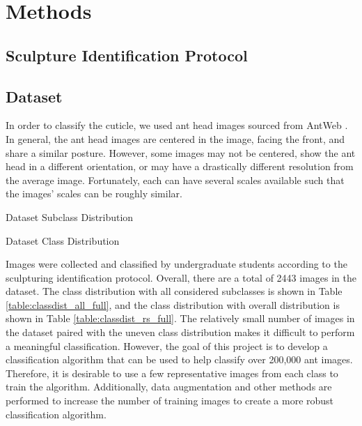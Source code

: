 \documentclass{aci}
\begin{document}
\section{Methods}

\subsection{Sculpture Identification Protocol}

\subsection{Dataset}
In order to classify the cuticle, we used ant head images sourced from AntWeb
\cite{antweb}. In general, the ant head images are centered in the image, facing
the front, and share a similar posture. However, some images may not be
centered, show the ant head in a different orientation, or may have a
drastically different resolution from the average image. Fortunately, each can
have several scales available such that the images' scales can be roughly
similar.

\begin{table}[h]
  \centering
  \caption{Dataset Subclass Distribution}
  \label{table:classdist_all_full}
  
\end{table}

\begin{table}[h]
  \centering
  \caption{Dataset Class Distribution}
  \label{table:classdist_rs_full}
  
\end{table}

Images were collected and classified by undergraduate students according to the
sculpturing identification protocol. Overall, there are a total of 2443 images
in the dataset. The class distribution with all considered subclasses is shown
in Table \ref{table:classdist_all_full}, and the class distribution with overall
distribution is shown in Table \ref{table:classdist_rs_full}. The relatively
small number of images in the dataset paired with the uneven class distribution
makes it difficult to perform a meaningful classification. However, the goal of
this project is to develop a classification algorithm that can be used to help
classify over 200,000 ant images. Therefore, it is desirable to use a few
representative images from each class to train the algorithm. Additionally, data
augmentation and other methods are performed to increase the number of training
images to create a more robust classification algorithm.
\end{document}

